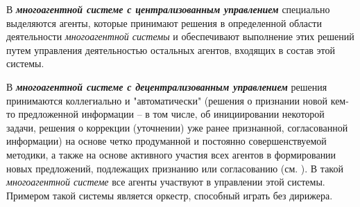 В \textbf{\textit{многоагентной системе с централизованным управлением}} специально выделяются агенты, которые принимают решения в определенной области деятельности \textit{многоагентной системы} и обеспечивают выполнение этих решений путем управления деятельностью остальных агентов, входящих в состав этой системы.

В \textbf{\textit{многоагентной системе с децентрализованным управлением}} решения принимаются коллегиально и "автоматически"{} (решения о признании новой кем-то предложенной информации – в том числе, об инициировании некоторой задачи, решения о коррекции (уточнении) уже ранее признанной, согласованной информации) на основе четко продуманной и постоянно совершенствуемой методики, а также на основе активного участия всех агентов в формировании новых предложений, подлежащих признанию или согласованию (см. ). 
В такой \textit{многоагентной системе} все агенты участвуют в управлении этой системы. 
Примером такой системы является оркестр, способный играть без дирижера.


